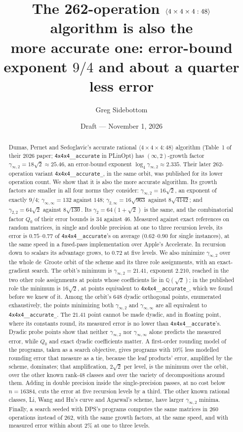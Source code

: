 \documentclass[11pt]{article}
\title{The 262-operation $\mm{4\times4\times4:48}$ algorithm is also the\\
more accurate one: error-bound exponent $9/4$ and about a quarter
less error}
\author{Greg Sidebottom}
\date{Draft --- November 1, 2026}
\theoremstyle{remark}
\newcommand{\Q}{\mathbb{Q}}
\newcommand{\ginf}{\gamma_{\infty,2}}
\newcommand{\giinf}{\gamma_{\infty,\infty}}
\newcommand{\mm}[1]{\langle #1\rangle}
\newcommand{\acc}{\texttt{4x4x4\_\allowbreak 48\_\allowbreak accurate}\xspace}
\newcommand{\acct}{\texttt{4x4x4\_\allowbreak 48\_\allowbreak accurate\_\allowbreak 262}\xspace}
\begin{document}
\maketitle

\begin{abstract}
Dumas, Pernet and Sedoglavic's accurate rational $\mm{4\times4\times4:48}$
algorithm (Table~1 of their 2026 paper; \acc in PLinOpt) has
$(\infty,2)$-growth factor
$\ginf=18\sqrt2\approx25.46$, an error-bound exponent $\log_4\ginf\approx2.335$.
Their later $262$-operation variant \acct, in the same orbit, was published for
its lower operation count.  We show that it is also the more accurate
algorithm.  Its growth factors are smaller in all four norms they
consider: $\ginf=16\sqrt2$, an exponent of exactly $9/4$;
$\giinf=132$ against $148$; $\gamma_{2,\infty}=16\sqrt{963}$ against
$8\sqrt{4142}$; and $\gamma_{2,2}=64\sqrt2$ against $8\sqrt{130}$.  Its
$\gamma_2=64(1+\sqrt2)$ is the same, and the combinatorial factor $Q_0$
of their error bounds is $34$ against $46$.  Measured against exact references on random
matrices, in single and double precision at one to three recursion
levels, its error is $0.75$--$0.77$ of \acc's on average ($0.62$--$0.90$ for single instances), at the same speed in a
fused-pass implementation over Apple's Accelerate.  In recursion down to scalars its advantage grows,
to $0.72$ at five levels.  We also minimize $\ginf$ over the whole
de~Groote orbit of the scheme and its three role assignments, with an
exact-gradient search.  The orbit's minimum is $\ginf=21.41$, exponent
$2.210$, reached in the two other role assignments at points whose
coefficients lie in $\Q(\sqrt2)$; in the published role the minimum is
$16\sqrt2$, at points equivalent to \acct, which we found before we
knew of it.  Among the orbit's $648$ dyadic orthogonal points, enumerated
exhaustively, the points minimizing both $\ginf$ and $\giinf$ are all
equivalent to \acct.  The $21.41$ point cannot be made dyadic, and in
floating point, where its constants round, its measured error is no
lower than \acc's.  Dyadic probe points show that neither $\ginf$ nor
$\giinf$ alone predicts the measured error, while $Q_0$ and exact dyadic
coefficients matter.  A first-order rounding model of the programs,
taken as a search objective, gives programs with $10\%$ less modelled
rounding error that measure as a tie, because the leaf products' error,
amplified by the scheme, dominates; that amplification, $2\sqrt2$ per
level, is the minimum over the orbit, over the other known rank-$48$
classes and over the variety of decompositions around them.  Adding in
double precision inside the single-precision passes, at no cost below
$n=16384$, cuts the error at five recursion levels by a third.  The
other known
rational classes, Li, Wang and Hu's curve and Agarwal's scheme, have
larger $\ginf$ minima.  Finally, a search seeded with DPS's programs
computes the same matrices in $260$ operations instead of $262$, with
the same growth factors, at the same speed, and with measured error
within about $2\%$ at one to three levels.
\end{abstract}
\end{document}
